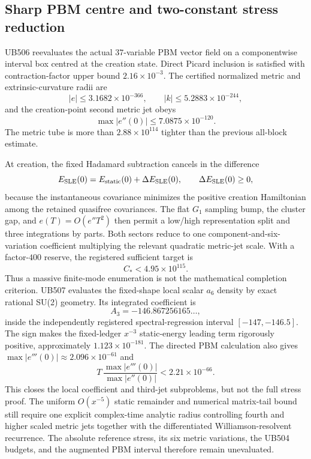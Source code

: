 \documentclass[11pt]{article}
\theoremstyle{definition}
\theoremstyle{remark}
\begin{document}
\subsection{Sharp PBM centre and two-constant stress reduction}

UB506 reevaluates the actual $37$-variable PBM vector field on a componentwise interval box centred at the creation state. Direct Picard inclusion is satisfied with contraction-factor upper bound $2.16\times10^{-3}$. The certified normalized metric and extrinsic-curvature radii are
\begin{equation}
 |e|\le 3.1682\times10^{-366},\qquad |k|\le 5.2883\times10^{-244},
\end{equation}
and the creation-point second metric jet obeys
\begin{equation}
 \max |e''(0)|\le 7.0875\times10^{-120}.
\end{equation}
The metric tube is more than $2.88\times10^{114}$ tighter than the previous all-block estimate.

At creation, the fixed Hadamard subtraction cancels in the difference
\begin{equation}
 E_{\rm SLE}(0)=E_{\rm static}(0)+\Delta E_{\rm SLE}(0),
 \qquad \Delta E_{\rm SLE}(0)\ge0,
\end{equation}
because the instantaneous covariance minimizes the positive creation Hamiltonian among the retained quasifree covariances. The flat $G_1$ sampling bump, the cluster gap, and $e(T)=O(e''T^2)$ then permit a low/high representation split and three integrations by parts. Both sectors reduce to one component-and-six-variation coefficient multiplying the relevant quadratic metric-jet scale. With a factor-$400$ reserve, the registered sufficient target is
\begin{equation}
 C_*<4.95\times10^{115}.
\end{equation}
Thus a massive finite-mode enumeration is not the mathematical completion criterion. UB507 evaluates the fixed-shape local scalar $a_6$ density by exact rational SU(2) geometry. Its integrated coefficient is
\begin{equation}
 A_3=-146.867256165\ldots,
\end{equation}
inside the independently registered spectral-regression interval $[-147,-146.5]$. The sign makes the fixed-ledger $x^{-3}$ static-energy leading term rigorously positive, approximately $1.123\times10^{-181}$. The directed PBM calculation also gives $\max|e'''(0)|\approx2.096\times10^{-61}$ and
\begin{equation}
 T\,\frac{\max|e'''(0)|}{\max|e''(0)|}<2.21\times10^{-66}.
\end{equation}
This closes the local coefficient and third-jet subproblems, but not the full stress proof. The uniform $O(x^{-5})$ static remainder and numerical matrix-tail bound still require one explicit complex-time analytic radius controlling fourth and higher scaled metric jets together with the differentiated Williamson-resolvent recurrence. The absolute reference stress, its six metric variations, the UB504 budgets, and the augmented PBM interval therefore remain unevaluated.
\end{document}

